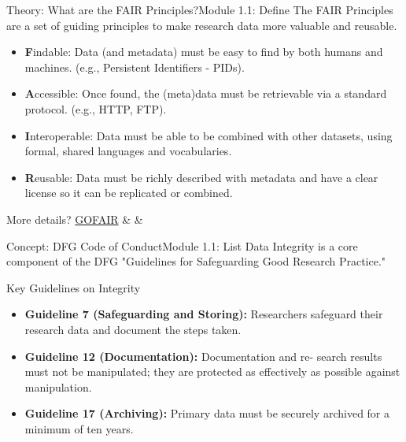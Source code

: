 \begin{frame}{Theory: What are the FAIR Principles?}{Module 1.1: Define}
    The FAIR Principles are a set of guiding principles to make research data more valuable and reusable.
    
    \begin{itemize}
        \item \textbf{F}indable: Data (and metadata) must be easy to find by both humans and machines. (e.g., Persistent Identifiers - PIDs).
        \pause
        \item \textbf{A}ccessible: Once found, the (meta)data must be retrievable via a standard protocol. (e.g., HTTP, FTP).
        \pause
        \item \textbf{I}nteroperable: Data must be able to be combined with other datasets, using formal, shared languages and vocabularies.
        \pause
        \item \textbf{R}eusable: Data must be richly described with metadata and have a clear license so it can be replicated or combined.
    \end{itemize}
    More details? \href{https://www.go-fair.org/wp-content/uploads/2022/01/FAIRPrinciples_overview.pdf}{GOFAIR} \&
    \cite{turning} \& \cite{wilkinson_fair_2016}
\end{frame}

\begin{frame}{Concept: DFG Code of Conduct}{Module 1.1: List}
    Data Integrity is a core component of the DFG "Guidelines for Safeguarding Good Research Practice." 
    \cite{deutsche_forschungsgemeinschaft_2025_14281892}
    
    
    \begin{block}{Key Guidelines on Integrity}
        \begin{itemize}
            \item \textbf{Guideline 7 (Safeguarding and Storing):} Researchers safeguard their research data and document the steps taken.
            \pause
            \item \textbf{Guideline 12 (Documentation):} Documentation and re- search results must not be manipulated; they are protected as effectively as possible against manipulation.
            \pause
            \item \textbf{Guideline 17 (Archiving):} Primary data must be securely archived for a minimum of ten years.
        \end{itemize}
    \end{block}
\end{frame}

